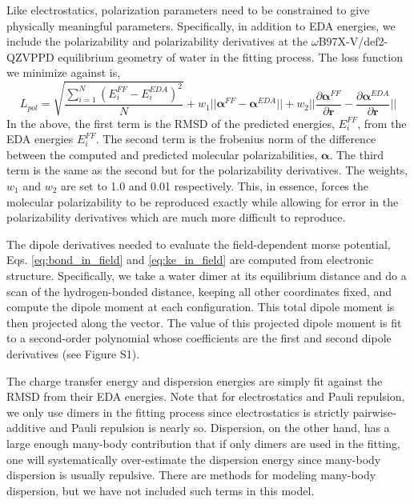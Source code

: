 \documentclass[journal=jacsat,manuscript=article]{achemso}
\begin{document}
Like electrostatics, polarization parameters need to be constrained to give physically meaningful
parameters. Specifically, in addition to EDA energies, we include the polarizability and polarizability derivatives
at the $\omega$B97X-V/def2-QZVPPD equilibrium geometry of water in the fitting process.
The loss function we minimize against is,
\begin{equation}
  L_{pol}=\sqrt{\frac{\sum_{i=1}^{N}(E_i^{FF}-E_i^{EDA})^2}{N}} + w_1||\bm{\alpha}^{FF}-\bm{\alpha}^{EDA}||+w_2||\frac{\partial\bm{\alpha}^{FF}}{\partial \bm{r}}-\frac{\partial\bm{\alpha}^{EDA}}{\partial \bm{r}}||
\label{eq:pol_loss}
\end{equation}
\noindent
In the above, the first term is the RMSD of the predicted energies, $E_i^{FF}$, from the
EDA energies $E_i^{FF}$. The second term is the frobenius norm of the difference between the
computed and predicted molecular polarizabilities, $\bm{\alpha}$. The third term is the same as
the second but for the polarizability derivatives. The weights, $w_1$ and $w_2$ are set to
1.0 and 0.01 respectively. This, in essence, forces the molecular polarizability to be
reproduced exactly while allowing for error in the polarizability derivatives which are much
more difficult to reproduce.

The dipole derivatives needed to evaluate the field-dependent morse potential, Eqs. \ref{eq:bond_in_field} and \ref{eq:ke_in_field}
are computed from electronic structure. Specifically, we take a water dimer at its equilibrium
distance and do a scan of the hydrogen-bonded  distance, keeping all other coordinates fixed,
and compute the dipole moment at each configuration. This total dipole moment is then projected along
the  vector. The value of this projected dipole moment is fit to a second-order polynomial
whose coefficients are the first and second dipole derivatives (see Figure S1).

The charge transfer energy and dispersion energies are simply fit against the RMSD
from their EDA energies. Note that for electrostatics and Pauli repulsion, we only use dimers in
the fitting process since electrostatics is strictly pairwise-additive and Pauli repulsion is nearly so.
Dispersion, on the other hand, has a large enough many-body contribution that if only dimers
are used in the fitting, one will systematically over-estimate the dispersion energy since
many-body dispersion is usually repulsive. There are methods for modeling many-body dispersion,
but we have not included such terms in this model.\cite{anatole2010two,van2018new}
\end{document}
